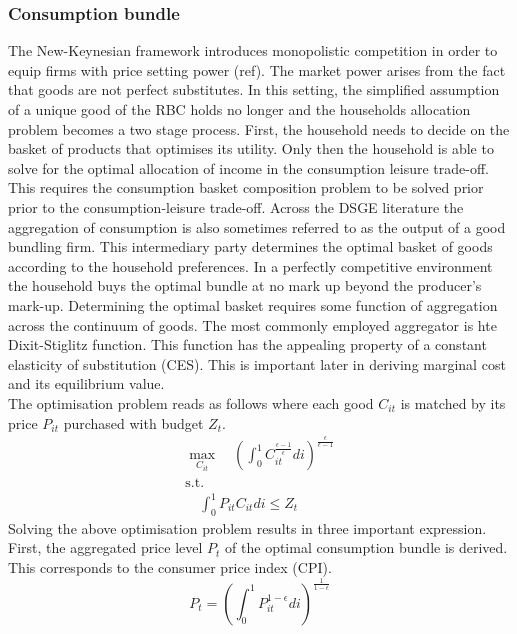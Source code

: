 \documentclass[12pt,a4paper,english]{article} %
\begin{document}
	\subsubsection{Consumption bundle}
	The New-Keynesian framework introduces monopolistic competition in order to equip firms with price setting power (ref). The market power arises from the fact that goods are not perfect substitutes. In this setting, the simplified assumption of a unique good of the RBC holds no longer and the households allocation problem becomes a two stage process. First, the household needs to decide on the basket of products that optimises its utility. Only then the household is able to solve for the optimal allocation of income in the consumption leisure trade-off. This requires the consumption basket composition problem to be solved prior prior to the consumption-leisure trade-off. Across the DSGE literature the aggregation of consumption is also sometimes referred to as the output of a good bundling firm. This intermediary party determines the optimal basket of goods according to the household preferences. In a perfectly competitive environment the household buys the optimal bundle at no mark up beyond the producer's mark-up.
	Determining the optimal basket requires some function of aggregation across the continuum of goods. The most commonly employed aggregator is hte Dixit-Stiglitz function. This function has the appealing property of a constant elasticity of substitution (CES). This is important later in deriving marginal cost and its equilibrium value. \\
	The optimisation problem reads as follows where each good $C_{it}$ is matched by its price $P_{it}$ purchased with budget $Z_t$.
	\begin{equation}
		\begin{aligned}
			\max_{C_{it}}
			\quad \left(\int_{0}^{1} C_{it}^{ \frac{\epsilon - 1}{\epsilon} } di 
			\right)^{ \frac{\epsilon}{\epsilon - 1} }\\
			\textrm{s.t.}\\
			\quad \int_{0}^{1} P_{it} C_{it} di \leq Z_t
		\end{aligned}
	\end{equation}
	Solving the above optimisation problem results in three important expression. First, the aggregated price level $P_t$ of the optimal consumption bundle is derived. This corresponds to the consumer price index (CPI).
	\begin{equation} \label{eq:1}
			P_t = \left(
						\int_{0}^{1} P_{it}^{ 1 - \epsilon } di 
					\right)^{ \frac{1}{1 - \epsilon} }
	\end{equation}
\end{document}
